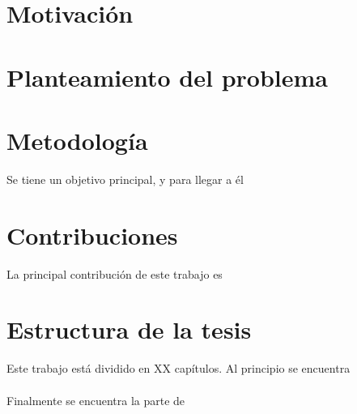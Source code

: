 \section{Motivación}


\blindtext

\section{Planteamiento del problema}
\blindtext
\section{Metodología}

Se tiene un objetivo principal, y para llegar a \'el %
\blindtext

\section{Contribuciones}

La principal contribución de este trabajo es 
\blindtext

\section{Estructura de la tesis}

Este trabajo está dividido en XX capítulos. Al principio se encuentra 
\\\\
Finalmente se encuentra la parte de 